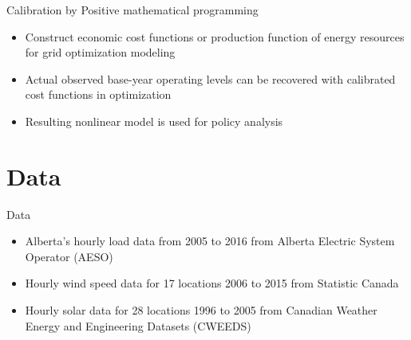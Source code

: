 \documentclass[newPxFont,numfooter,progressbar,sectionpages]{beamer}
\begin{document}

\begin{frame}[c]{Calibration by Positive mathematical programming}

\begin{itemize}
	\item Construct economic cost functions or production function of energy resources for grid optimization modeling   
	\item Actual observed base-year operating levels can be recovered with calibrated cost functions in optimization
	\item Resulting nonlinear model is used for policy analysis
	
\end{itemize}


\end{frame}




%
%
\section{Data}




\begin{frame}[c]{Data}

\begin{itemize}
	\item Alberta’s hourly load data from 2005 to 2016 from Alberta Electric System Operator (AESO)
	\item Hourly wind speed data for 17 locations  2006 to 2015 from Statistic Canada
	\item Hourly solar data for 28 locations  1996 to 2005 from Canadian Weather Energy and Engineering Datasets (CWEEDS)
	
\end{itemize}


\end{frame}





\end{document}
